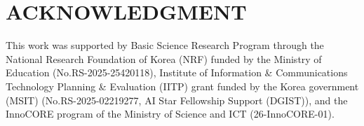 \section*{ACKNOWLEDGMENT}
This work was supported by Basic Science Research Program through the National Research Foundation of Korea (NRF) funded by the Ministry of Education (No.RS-2025-25420118), Institute of Information \& Communications Technology Planning \& Evaluation (IITP) grant funded by the Korea government (MSIT) (No.RS-2025-02219277, AI Star Fellowship Support (DGIST)), and the InnoCORE program of the Ministry of Science and ICT (26-InnoCORE-01).